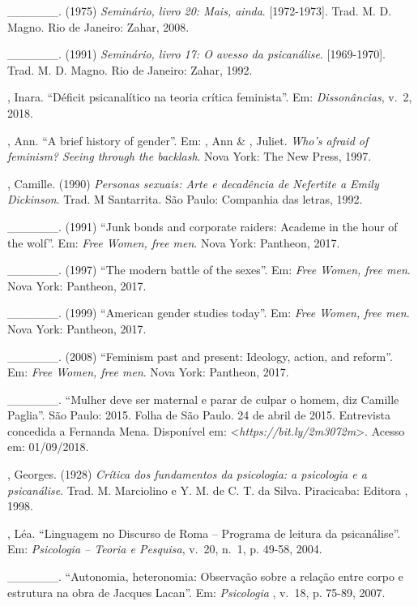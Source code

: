 \begin{Parskip}
\_\_\_\_\_\_. (1975) \emph{Seminário, livro 20: Mais, ainda}.
{[}1972-1973{]}. Trad. M. D. Magno. Rio de Janeiro: Zahar, 2008.

\_\_\_\_\_\_. (1991) \emph{Seminário, livro 17: O avesso da
psicanálise}. {[}1969-1970{]}. Trad. M. D. Magno. Rio de Janeiro: Zahar, 1992.

, Inara. ``Déficit psicanalítico na teoria crítica feminista''. Em:
\emph{Dissonâncias}, v.~2, 2018.

, Ann. ``A brief history of gender''. Em: , Ann \& ,
Juliet. \emph{Who's afraid of feminism? Seeing through the backlash}.
Nova York: The New Press, 1997.

, Camille. (1990) \emph{Personas sexuais: Arte e decadência de
Nefertite a Emily Dickinson}. Trad. M Santarrita. São Paulo: Companhia
das letras, 1992.

\_\_\_\_\_\_. (1991) ``Junk bonds and corporate raiders: Academe in
the hour of the wolf''. Em: \emph{Free Women, free men}. Nova York:
Pantheon, 2017.

\_\_\_\_\_\_. (1997) ``The modern battle of the sexes''. Em:
\emph{Free Women, free men}. Nova York: Pantheon, 2017.

\_\_\_\_\_\_. (1999) ``American gender studies today''. Em: \emph{Free
Women, free men}. Nova York: Pantheon, 2017.

\_\_\_\_\_\_. (2008) ``Feminism past and present: Ideology, action,
and reform''. Em: \emph{Free Women, free men}. Nova York: Pantheon,
2017.

\_\_\_\_\_\_. ``Mulher deve ser maternal e parar de culpar o homem,
diz Camille Paglia''. São Paulo: 2015. Folha de São Paulo. 24 de abril
de 2015. Entrevista concedida a Fernanda Mena. Disponível em:
\textless{}\emph{https://bit.ly/2m3072m}\textgreater{}.
Acesso em: 01/09/2018.

, Georges. (1928) \emph{Crítica dos fundamentos da psicologia: a
psicologia e a psicanálise}. Trad. M. Marciolino e Y. M. de C. T. da
Silva. Piracicaba: Editora , 1998.

, Léa. ``Linguagem no Discurso de Roma -- Programa de leitura da
psicanálise''. Em: \emph{Psicologia -- Teoria e Pesquisa}, v.~20, n.~1, p.
49-58, 2004.

\_\_\_\_\_\_. ``Autonomia, heteronomia: Observação sobre a relação
entre corpo e estrutura na obra de Jacques Lacan''. Em: \emph{Psicologia
}, v.~18, p. 75-89, 2007.


\end{Parskip}

